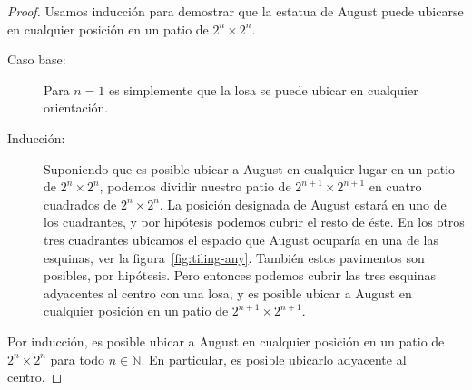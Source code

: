   \begin{proof}
    Usamos inducción
    para demostrar
    que la estatua de \foreignlanguage{english}{August}
    puede ubicarse en cualquier posición
    en un patio de \mbox{\(2^n \times 2^n\)}.
    \begin{description}
    \item[Caso base:]
      Para \(n = 1\) es simplemente que la losa
      se puede ubicar en cualquier orientación.
    \item[Inducción:]
      Suponiendo que es posible
      ubicar a \foreignlanguage{english}{August}
      en cualquier lugar en un patio de \mbox{\(2^n \times 2^n\)},
      podemos dividir
      nuestro patio de \mbox{\(2^{n + 1} \times 2^{n + 1}\)}
      en cuatro cuadrados de \mbox{\(2^n \times 2^n\)}.
      La posición designada de \foreignlanguage{english}{August}
      estará en uno de los cuadrantes,
      y por hipótesis podemos cubrir el resto de éste.
      En los otros tres cuadrantes
      ubicamos el espacio
      que \foreignlanguage{english}{August} ocuparía
      en una de las esquinas,
      ver la figura~\ref{fig:tiling-any}.
      También estos pavimentos son posibles,
      por hipótesis.
      Pero entonces podemos cubrir
      las tres esquinas adyacentes al centro
      con una losa,
      y es posible ubicar a \foreignlanguage{english}{August}
      en cualquier posición
      en un patio de \mbox{\(2^{n + 1} \times 2^{n + 1}\)}.
    \end{description}
    Por inducción,
    es posible ubicar a August en cualquier posición
    en un patio de \mbox{\(2^n \times 2^n\)}
    para todo \(n \in \mathbb{N}\).
    En particular,
    es posible ubicarlo adyacente al centro.
  \end{proof}

